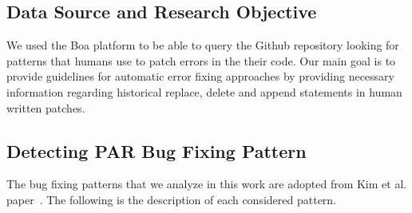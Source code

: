 \documentclass{sig-alternate-05-2015}
\begin{document}
\subsection{Data Source and Research Objective}
We used the Boa platform \cite{robert} to be able to query the Github repository looking for patterns that humans use to patch errors in the their code. Our main goal is to provide guidelines for automatic error fixing approaches by providing necessary information regarding historical replace, delete and append statements in human written patches.

\subsection{Detecting PAR Bug Fixing Pattern}\label{sec:method}
The bug fixing patterns that we analyze in this work are adopted from Kim et al. paper~\cite{dongsun}. The following is the description of each considered pattern.
\end{document}
